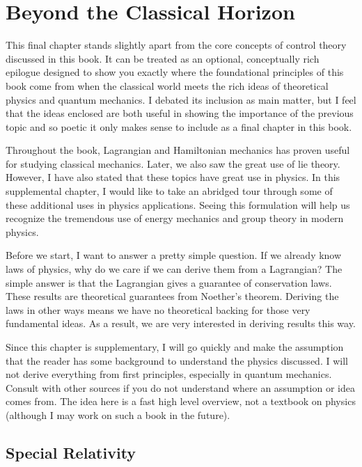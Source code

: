 
\chapter{Beyond the Classical Horizon}\label{chap:lagrange continued}

This final chapter stands slightly apart from the core concepts of control theory discussed in this book. It can be treated as an optional, conceptually rich epilogue designed to show you exactly where the foundational principles of this book come from when the classical world meets the rich ideas of theoretical physics and quantum mechanics. I debated its inclusion as main matter, but I feel that the ideas enclosed are both useful in showing the importance of the previous topic and so poetic it only makes sense to include as a final chapter in this book.

Throughout the book, \gls{Lagrangian} and \gls{Hamiltonian} mechanics has proven useful for studying classical mechanics. Later, we also saw the great use of \gls{lie theory}. However, I have also stated that these topics have great use in physics. In this supplemental chapter, I would like to take an abridged tour through some of these additional uses in physics applications. Seeing this formulation will help us recognize the tremendous use of energy mechanics and group theory in modern physics. 

Before we start, I want to answer a pretty simple question. If we already know laws of physics, why do we care if we can derive them from a \gls{Lagrangian}? The simple answer is that the \gls{Lagrangian} gives a guarantee of conservation laws. These results are theoretical guarantees from Noether's theorem. Deriving the laws in other ways means we have no theoretical backing for those very fundamental ideas. As a result, we are very interested in deriving results this way. 

Since this chapter is supplementary, I will go quickly and make the assumption that the reader has some background to understand the physics discussed. I will not derive everything from first principles, especially in quantum mechanics. Consult with other sources if you do not understand where an assumption or idea comes from. The idea here is a fast high level overview, not a textbook on physics (although I may work on such a book in the future).

\section{Special Relativity}

